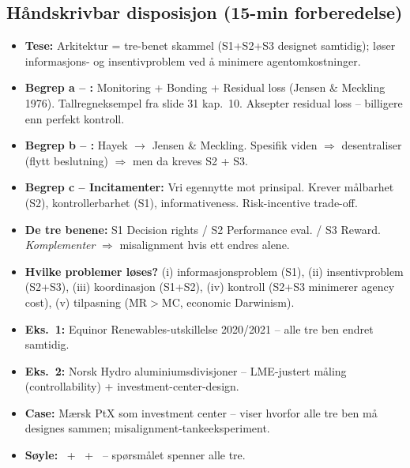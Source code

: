 \subsection*{Håndskrivbar disposisjon (15-min forberedelse)}
\begin{itemize}\setlength{\itemsep}{2pt}
\item \textbf{Tese:} Arkitektur = tre-benet skammel (S1+S2+S3 designet samtidig); løser informasjons- og insentivproblem ved å minimere agentomkostninger.
\item \textbf{Begrep a -- :} Monitoring + Bonding + Residual loss (Jensen \& Meckling 1976). Tallregneksempel fra slide 31 kap.\ 10. Aksepter residual loss -- billigere enn perfekt kontroll.
\item \textbf{Begrep b -- :} Hayek $\to$ Jensen \& Meckling. Spesifik viden $\Rightarrow$ desentraliser (flytt beslutning) $\Rightarrow$ men da kreves S2 + S3.
\item \textbf{Begrep c -- Incitamenter:} Vri egennytte mot prinsipal. Krever målbarhet (S2), kontrollerbarhet (S1), informativeness. Risk-incentive trade-off.
\item \textbf{De tre benene:} S1 Decision rights / S2 Performance eval. / S3 Reward. \emph{Komplementer} $\Rightarrow$ misalignment hvis ett endres alene.
\item \textbf{Hvilke problemer løses?} (i) informasjonsproblem (S1), (ii) insentivproblem (S2+S3), (iii) koordinasjon (S1+S2), (iv) kontroll (S2+S3 minimerer agency cost), (v) tilpasning (MR$>$MC, economic Darwinism).
\item \textbf{Eks.\ 1:} Equinor Renewables-utskillelse 2020/2021 -- alle tre ben endret samtidig.
\item \textbf{Eks.\ 2:} Norsk Hydro aluminiumsdivisjoner -- LME-justert måling (controllability) + investment-center-design.
\item \textbf{Case:} Mærsk PtX som investment center -- viser hvorfor alle tre ben må designes sammen; misalignment-tankeeksperiment.
\item \textbf{Søyle:} \SOne\ + \STwo\ + \SThree\ -- spørsmålet spenner alle tre.
\end{itemize}
